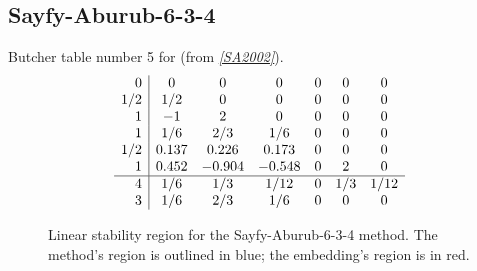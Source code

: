 \documentclass[letterpaper,10pt,english]{sphinxmanual}
\begin{document}
\subsection{Sayfy-Aburub-6-3-4}
\label{Butcher:butcher-sayfy-aburub}\label{Butcher:sayfy-aburub-6-3-4}
Butcher table number 5
for {\hyperref[c_interface/User_callable:c.ARKodeSetERKTableNum]{\emph{}}} (from \label{Butcher:id5}{\hyperref[References:sa2002]{\emph{{[}SA2002{]}}}}).
\begin{gather}
\begin{split}\begin{array}{r|cccccc}
  0 & 0 & 0 & 0 & 0 & 0 & 0 \\
  1/2 & 1/2 & 0 & 0 & 0 & 0 & 0 \\
  1 & -1 & 2 & 0 & 0 & 0 & 0 \\
  1 & 1/6 & 2/3 & 1/6 & 0 & 0 & 0 \\
  1/2 & 0.137 & 0.226 & 0.173 & 0 & 0 & 0 \\
  1 & 0.452 & -0.904 & -0.548 & 0 & 2 & 0 \\
  \hline
  4 & 1/6 & 1/3 & 1/12 & 0 & 1/3 & 1/12 \\
  3 & 1/6 & 2/3 & 1/6 & 0 & 0 & 0
\end{array}\end{split}\notag
\end{gather}\begin{figure}[htbp]
\centering
\capstart

\caption{Linear stability region for the Sayfy-Aburub-6-3-4 method.  The method's
region is outlined in blue; the embedding's region is in red.}\end{figure}
\end{document}
